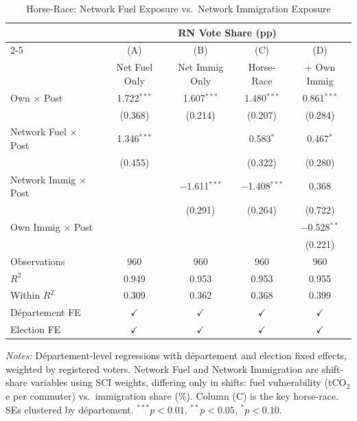 \begin{table}[htbp]
   \caption{\label{tab:horse_race} Horse-Race: Network Fuel Exposure vs.\ Network Immigration Exposure}
   \bigskip
   \centering
   \small
   \begin{tabular}{@{}lcccc@{}}
      \toprule
       & \multicolumn{4}{c}{RN Vote Share (pp)}\\
      \cmidrule(lr){2-5}
                                             & (A)            & (B)            & (C)            & (D) \\
                                             & Net Fuel Only  & Net Immig Only & Horse-Race     & + Own Immig \\
      \midrule
      Own $\times$ Post                      & 1.722$^{***}$  & 1.607$^{***}$  & 1.480$^{***}$  & 0.861$^{***}$\\
                                             & (0.368)        & (0.214)        & (0.207)        & (0.284)\\[4pt]
      Network Fuel $\times$ Post             & 1.346$^{***}$  &                & 0.583$^{*}$    & 0.467$^{*}$\\
                                             & (0.455)        &                & (0.322)        & (0.280)\\[4pt]
      Network Immig $\times$ Post            &                & $-$1.611$^{***}$ & $-$1.408$^{***}$ & 0.368\\
                                             &                & (0.291)        & (0.264)        & (0.722)\\[4pt]
      Own Immig $\times$ Post                &                &                &                & $-$0.528$^{**}$\\
                                             &                &                &                & (0.221)\\
      \midrule
      Observations                           & 960            & 960            & 960            & 960\\
      $R^2$                                  & 0.949          & 0.953          & 0.953          & 0.955\\
      Within $R^2$                           & 0.309          & 0.362          & 0.368          & 0.399\\
      \midrule
      D\'{e}partement FE                     & $\checkmark$   & $\checkmark$   & $\checkmark$   & $\checkmark$\\
      Election FE                            & $\checkmark$   & $\checkmark$   & $\checkmark$   & $\checkmark$\\
      \bottomrule
   \end{tabular}

   \par \raggedright \smallskip
   \textit{Notes:} D\'{e}partement-level regressions with d\'{e}partement and election fixed effects, weighted by registered voters. Network Fuel and Network Immigration are shift-share variables using SCI weights, differing only in shifts: fuel vulnerability (tCO$_2$e per commuter) vs.\ immigration share (\%). Column (C) is the key horse-race. SEs clustered by d\'{e}partement. $^{***}p<0.01$, $^{**}p<0.05$, $^{*}p<0.10$.
\end{table}
